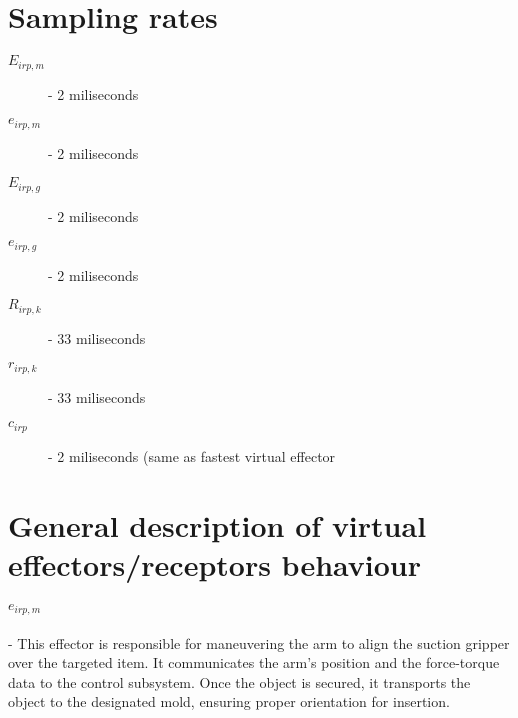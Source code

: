 \documentclass[12pt]{article}
\begin{document}






\section{Sampling rates}
\begin{description}
    \item[$E_{irp, m}$] - 2 miliseconds
	\item[$e_{irp, m}$] - 2 miliseconds
	\item[$E_{irp, g}$] - 2 miliseconds
	\item[$e_{irp, g}$] - 2 miliseconds
	\item[$R_{irp, k}$] - 33 miliseconds
	\item[$r_{irp, k}$] - 33 miliseconds
	\item[$c_{irp}$] - 2 miliseconds (same as fastest virtual effector
\end{description}

\section{General description of virtual effectors/receptors behaviour}
\paragraph{$e_{irp, m}$} - This effector is responsible for maneuvering the arm to align the suction gripper over the targeted item. It communicates the arm's position and the force-torque data to the control subsystem. Once the object is secured, it transports the object to the designated mold, ensuring proper orientation for insertion.
\end{document}
